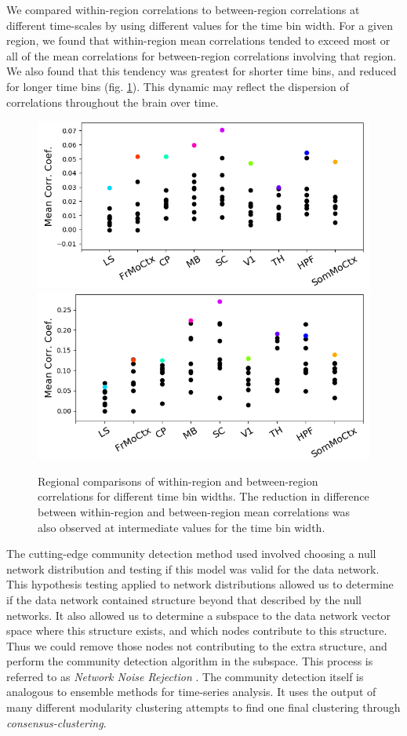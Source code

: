 \documentclass[a4paper,12pt]{article}
\theoremstyle{definition}
\begin{document}
We compared within-region correlations to between-region correlations at different time-scales by using different values for the time bin width. For a given region, we found that within-region mean correlations tended to exceed most or all of the mean correlations for between-region correlations involving that region. We also found that this tendency was greatest for shorter time bins, and reduced for longer time bins (fig. \ref{fig:within_between}). This dynamic may reflect the dispersion of correlations throughout the brain over time.

\begin{figure}[t!]
    \centering
    \includegraphics[width=0.45\columnwidth]{images/Krebs_0p05_corr_comp.png}
    \includegraphics[width=0.45\columnwidth]{images/Krebs_3p0_corr_comp.png}
    \vspace{-0.4cm}
    \caption{Regional comparisons of within-region and between-region correlations for different time bin widths. The reduction in difference between within-region and between-region mean correlations was also observed at intermediate values for the time bin width.}
    \label{fig:within_between}
\end{figure}

The cutting-edge community detection method used involved choosing a null network distribution and testing if this model was valid for the data network. This hypothesis testing applied to network distributions allowed us to determine if the data network contained structure beyond that described by the null networks. It also allowed us to determine a subspace to the data network vector space where this structure exists, and which nodes contribute to this structure. Thus we could remove those nodes not contributing to the extra structure, and perform the community detection algorithm in the subspace. This process is referred to as \textit{Network Noise Rejection} \cite{humphries}. The community detection itself is analogous to ensemble methods for time-series analysis. It uses the output of many different modularity clustering attempts to find one final clustering through \textit{consensus-clustering}.
\end{document}

